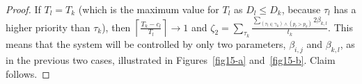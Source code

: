 \documentclass[letter]{sig-alternate}
\begin{document}
\begin{proof}
If $T_{l}=T_{k}$ (which is
the maximum value for $T_{l}$ as $D_{l}\le D_{k}$, because
$\tau_{l}$ has a higher priority than $\tau_{k}$), then $\left\lceil\frac{T_{k}-c_{l}}{T_{l}}\right\rceil\rightarrow1$
and $\zeta_2=\sum_{\tau_{k}}\frac{\sum_{\left(\tau_{l}\in\gamma_{k}\right)\wedge\left(p_{l}>p_{k}\right)}2\beta_{k,l}}{t_{k}}$. 
This means that the system will be controlled by only two parameters, $\beta_{i,j}$ and $\beta_{k,l}$, as in the previous two cases, illustrated in Figures~\ref{fig15-a} and~\ref{fig15-b}. Claim follows.
\end{proof}

\begin{figure}
\begin{centering}
\end{centering}
\end{figure}
\end{document}
